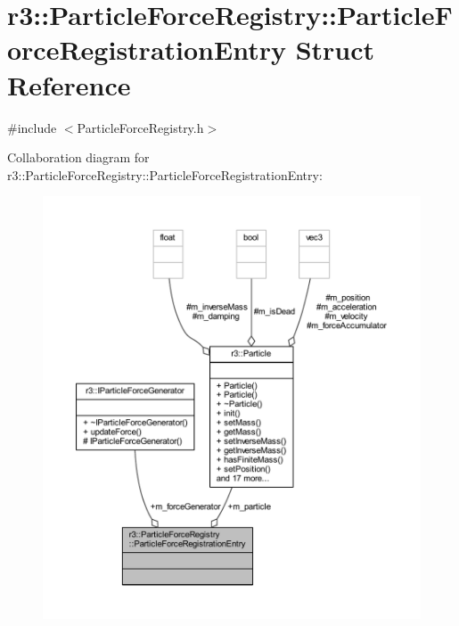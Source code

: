 \hypertarget{structr3_1_1_particle_force_registry_1_1_particle_force_registration_entry}{}\section{r3\+:\+:Particle\+Force\+Registry\+:\+:Particle\+Force\+Registration\+Entry Struct Reference}
\label{structr3_1_1_particle_force_registry_1_1_particle_force_registration_entry}


{\ttfamily \#include $<$Particle\+Force\+Registry.\+h$>$}



Collaboration diagram for r3\+:\+:Particle\+Force\+Registry\+:\+:Particle\+Force\+Registration\+Entry\+:\nopagebreak
\begin{figure}[H]
\begin{center}
\leavevmode
\includegraphics[width=350pt]{structr3_1_1_particle_force_registry_1_1_particle_force_registration_entry__coll__graph}
\end{center}
\end{figure}
